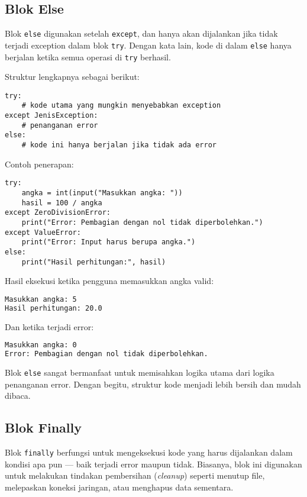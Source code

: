 \subsection*{Blok Else}

Blok \texttt{else} digunakan setelah \texttt{except}, dan hanya akan dijalankan jika tidak terjadi exception dalam blok \texttt{try}. Dengan kata lain, kode di dalam \texttt{else} hanya berjalan ketika semua operasi di \texttt{try} berhasil.

Struktur lengkapnya sebagai berikut:

\begin{lstlisting}[style=PythonStyle, caption={Struktur lengkap try-except-else}]
try:
    # kode utama yang mungkin menyebabkan exception
except JenisException:
    # penanganan error
else:
    # kode ini hanya berjalan jika tidak ada error
\end{lstlisting}

Contoh penerapan:

\begin{lstlisting}[style=PythonStyle, caption={Penggunaan blok else}]
try:
    angka = int(input("Masukkan angka: "))
    hasil = 100 / angka
except ZeroDivisionError:
    print("Error: Pembagian dengan nol tidak diperbolehkan.")
except ValueError:
    print("Error: Input harus berupa angka.")
else:
    print("Hasil perhitungan:", hasil)
\end{lstlisting}

Hasil eksekusi ketika pengguna memasukkan angka valid:

\begin{lstlisting}[language=bash]
Masukkan angka: 5
Hasil perhitungan: 20.0
\end{lstlisting}

Dan ketika terjadi error:

\begin{lstlisting}[language=bash]
Masukkan angka: 0
Error: Pembagian dengan nol tidak diperbolehkan.
\end{lstlisting}

Blok \texttt{else} sangat bermanfaat untuk memisahkan logika utama dari logika penanganan error. Dengan begitu, struktur kode menjadi lebih bersih dan mudah dibaca.

\subsection*{Blok Finally}

Blok \texttt{finally} berfungsi untuk mengeksekusi kode yang harus dijalankan dalam kondisi apa pun — baik terjadi error maupun tidak. Biasanya, blok ini digunakan untuk melakukan tindakan pembersihan (\textit{cleanup}) seperti menutup file, melepaskan koneksi jaringan, atau menghapus data sementara.

